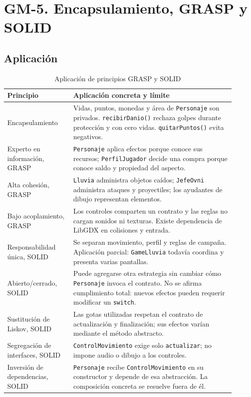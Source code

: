 \section{GM-5. Encapsulamiento, GRASP y SOLID}

\subsection*{Aplicación}

{\small
\begin{longtable}{p{0.27\linewidth}p{0.66\linewidth}}
\caption{Aplicación de principios GRASP y SOLID}\\
\toprule
Principio & Aplicación concreta y límite \\
\midrule
\endhead
Encapsulamiento & Vidas, puntos, monedas y área de \texttt{Personaje} son privados. \texttt{recibirDanio()} rechaza golpes durante protección y con cero vidas. \texttt{quitarPuntos()} evita negativos. \\
Experto en información, GRASP & \texttt{Personaje} aplica efectos porque conoce sus recursos; \texttt{PerfilJugador} decide una compra porque conoce saldo y propiedad del aspecto. \\
Alta cohesión, GRASP & \texttt{Lluvia} administra objetos caídos; \texttt{JefeOvni} administra ataques y proyectiles; los ayudantes de dibujo representan elementos. \\
Bajo acoplamiento, GRASP & Los controles comparten un contrato y las reglas no cargan sonidos ni texturas. Existe dependencia de LibGDX en colisiones y entrada. \\
Responsabilidad única, SOLID & Se separan movimiento, perfil y reglas de campaña. Aplicación parcial: \texttt{GameLluvia} todavía coordina y presenta varias pantallas. \\
Abierto/cerrado, SOLID & Puede agregarse otra estrategia sin cambiar cómo \texttt{Personaje} invoca el contrato. No se afirma cumplimiento total: nuevos efectos pueden requerir modificar un \texttt{switch}. \\
Sustitución de Liskov, SOLID & Las gotas utilizadas respetan el contrato de actualización y finalización; sus efectos varían mediante el método abstracto. \\
Segregación de interfaces, SOLID & \texttt{ControlMovimiento} exige solo \texttt{actualizar}; no impone audio o dibujo a los controles. \\
Inversión de dependencias, SOLID & \texttt{Personaje} recibe \texttt{ControlMovimiento} en su constructor y depende de esa abstracción. La composición concreta se resuelve fuera de él. \\
\bottomrule
\end{longtable}
}

